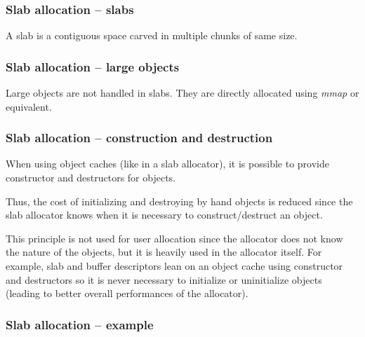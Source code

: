 
\begin{frame}
  \frametitle{Slab allocation -- slabs}

  A slab is a contiguous space carved in multiple chunks of same size.

  \begin{center}
  \end{center}

\end{frame}


\begin{frame}
  \frametitle{Slab allocation -- large objects}

  Large objects are not handled in slabs. They are directly allocated
  using \emph{mmap} or equivalent.

\end{frame}


\begin{frame}
  \frametitle{Slab allocation -- construction and destruction}

  When using object caches (like in a slab allocator), it is possible
  to provide constructor and destructors for objects.

  \-

  Thus, the cost of initializing and destroying by hand objects is
  reduced since the slab allocator knows when it is necessary to
  construct/destruct an object.

  \-

  This principle is not used for user allocation since the allocator
  does not know the nature of the objects, but it is heavily used in
  the allocator itself. For example, slab and buffer descriptors lean
  on an object cache using constructor and destructors so it is never
  necessary to initialize or uninitialize objects (leading to better
  overall performances of the allocator).

\end{frame}


\begin{frame}
  \frametitle{Slab allocation -- example}

  \begin{center}
  \end{center}

\end{frame}

